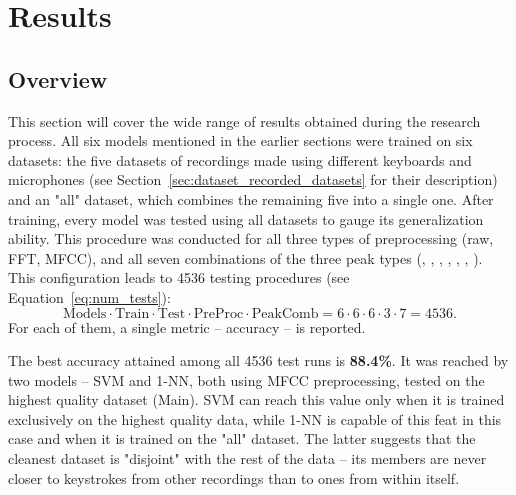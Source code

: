 \documentclass[../main.tex]{subfiles}
\begin{document}
\chapter{Results}
\label{cha:results}

\section{Overview}  %
\label{sec:results_overview}
This section will cover the wide range of results obtained during the research process.
All six models mentioned in the earlier sections were trained on six datasets: the five datasets of recordings made using different keyboards and microphones (see Section~\ref{sec:dataset_recorded_datasets} for their description) and an "all" dataset, which combines the remaining five into a single one.
After training, every model was tested using all datasets to gauge its generalization ability.
This procedure was conducted for all three types of preprocessing (raw, FFT, MFCC), and all seven combinations of the three peak types (, , , , , , ).
This configuration leads to 4536 testing procedures (see Equation~\ref{eq:num_tests}): 
\begin{equation}
    \mathrm{Models} \cdot \mathrm{Train} \cdot \mathrm{Test} \cdot \mathrm{PreProc} \cdot \mathrm{PeakComb} = 6 \cdot 6 \cdot 6 \cdot 3 \cdot 7 = 4536.
    \label{eq:num_tests}
\end{equation}
For each of them, a single metric -- accuracy -- is reported. 

The best accuracy attained among all 4536 test runs is \textbf{88.4\%}. It was reached by two models -- SVM and 1-NN, both using MFCC preprocessing, tested on the highest quality dataset (Main).
SVM can reach this value only when it is trained exclusively on the highest quality data, while 1-NN is capable of this feat in this case and when it is trained on the "all" dataset.
The latter suggests that the cleanest dataset is "disjoint" with the rest of the data -- its members are never closer to keystrokes from other recordings than to ones from within itself.
\end{document}
